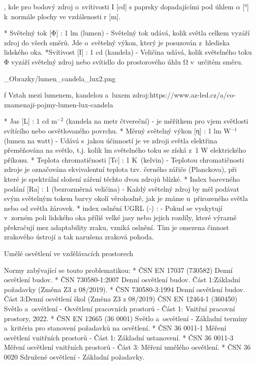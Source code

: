 \medskip
, kde pro bodový zdroj o~svítivosti I [cd] s paprsky dopadajícími pod úhlem $\alpha$ [°] k~normále plochy ve vzdálenosti r [m].


\begitems
* {\sbf Světelný tok [Φ]} : 1 lm (lumen) - Světelný tok udává, kolik světla celkem vyzáří zdroj do všech směrů.
    Jde o~světelný výkon, který je posuzován z~hlediska lidského oka.
*{\sbf Svítivost [I]} : 1 cd (kandela) - Veličina udává, kolik světelného toku Φ vyzáří světelný zdroj nebo svítidlo
    do prostorového úhlu Ω v~určitém směru.
\enditems

\medskip {}
\picw=8cm _Obrazky/lumen_candela_lux2.png
\caption/f Vztah mezi lumenem, kandelou a~luxem
\medskip
zdroj:https://www.az-led.cz/a/co-znamenaji-pojmy-lumen-lux-candela

\begitems
* {\sbf Jas [L]} : 1 cd m$^{-2}$ (kandela na metr čtvereční)
    - je měřítkem pro vjem světlosti svítícího nebo osvětlovaného povrchu.
* {\sbf Měrný světelný výkon [η]} : 1 lm W$^{-1}$ (lumen na watt) -
    Udává s~jakou účinností je ve zdroji světla elektřina přeměňována na světlo, t.j. kolik
    lm světelného toku se získá z~1 W elektrického příkonu.
* {\sbf Teplota chromatičnosti [Tc]} : 1 K~(kelvin) - Teplotou chromatičnosti zdroje je označována ekvivalentní
    teplota tzv. černého zářiče (Planckova), při které je spektrální složení záření těchto dvou zdrojů blízké.
* {\sbf Index barevného podání [Ra]} : 1 (bezrozměrná veličina) -
    Každý světelný zdroj by měl podávat svým světelným tokem barvy okolí věrohodně, jak je známe u~přirozeného
    světla nebo od světla žárovek.
* {\sbf index oslnění UGRL (-)} : - Pokud se vyskytují v~zorném poli lidského oka příliš velké jasy nebo jejich
    rozdíly, které výrazně překračují mez adaptability zraku, vzniká oslnění. Tím je omezena činnost zrakového ústrojí a
    tak narušena zraková pohoda.
\enditems

\sec Umělé osvětlení ve vzdělávacích prostorech

Normy zabývající se touto problematikou:
\begitems 
* ČSN EN 17037 (730582) Denní osvětlení budov.
* ČSN 730580-1:2007 Denní osvětlení budov. Část 1:Základní požadavky (Změna Z3 z 08/2019).
* ČSN 730580-3:1994 Denní osvětlení budov. Část 3:Denní osvětlení škol (Změna Z3 z 08/2019)
ČSN EN 12464-1 (360450) Světlo a~osvětlení - Osvětlení pracovních prostorů - Část 1: Vnitřní pracovní prostory, 2022.
* ČSN EN 12665 (36 0001) Světlo a~osvětlení - Základní termíny a~kritéria pro stanovení požadavků na osvětlení.
* ČSN 36 0011-1 Měření osvětlení vnitřních prostorů - Část 1: Základní ustanovení.
* ČSN 36 0011-3 Měření osvětlení vnitřních prostorů - Část 3: Měření umělého osvětlení.
* ČSN 36 0020 Sdružené osvětlení - Základní požadavky.
\enditems

